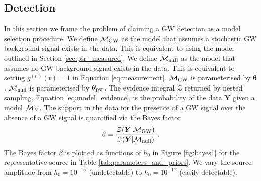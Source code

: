 \documentclass[fleqn,usenatbib,useAMS]{mnras}
\begin{document}
\subsection{Detection}\label{sec:result_detection}
In this section we frame the problem of claiming a GW detection as a model selection procedure. We define $\mathcal{M}_{\rm GW}$ as the model that assumes a stochastic GW background signal exists in the data. This is equivalent to using the model outlined in Section \ref{sec:psr_measured}. We define $\mathcal{M}_{\rm null}$ as the model that assumes no GW background signal exists in the data. This is equivalent to setting $g^{(n)}(t)=1$ in Equation \eqref{eq:measurement}. $\mathcal{M}_{\rm GW}$ is parameterised by $\boldsymbol{\theta}$. $\mathcal{M}_{\rm null}$ is parameterised by $\boldsymbol{\theta}_{\rm psr}$. The evidence integral $\mathcal{Z}$ returned by nested sampling, Equation \eqref{eq:model_evidence}, is the probability of the data $\boldsymbol{Y}$ given a model $\mathcal{M}_{\rm M}$.  The support in the data for the presence of a GW signal over the absence of a GW signal is quantified via the Bayes factor
\begin{equation}
	\beta = \frac{\mathcal{Z}(\boldsymbol{Y} | \mathcal{M}_{\rm GW})}{\mathcal{Z}(\boldsymbol{Y} | \mathcal{M}_{\rm null})} \ . \label{eq:bayes}
\end{equation}
The Bayes factor $\beta$ is plotted as functions of $h_0$ in Figure \ref{fig:bayes1} for the representative source in Table \ref{tab:parameters_and_priors}. We vary the source amplitude from $h_0 = 10^{-15}$ (undetectable) to $h_0 = 10^{-12}$ (easily detectable). 
\end{document}
